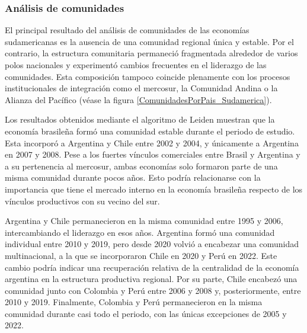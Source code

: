 


\subsubsection{Análisis de comunidades}


El principal resultado del análisis de comunidades de las economías sudamericanas es la ausencia de una comunidad regional única y estable. Por el contrario, la estructura comunitaria permaneció fragmentada alrededor de varios polos nacionales y experimentó cambios frecuentes en el liderazgo de las comunidades. Esta composición tampoco coincide plenamente con los procesos institucionales de integración como el  \gls{mercosur}, la Comunidad Andina o la Alianza del Pacífico (véase la figura \ref{ComunidadesPorPais_Sudamerica}).

Los resultados obtenidos mediante el algoritmo de Leiden muestran que la economía brasileña formó una comunidad estable durante el periodo de estudio. Esta incorporó a Argentina y Chile entre 2002 y 2004, y únicamente a Argentina en 2007 y 2008. Pese a los fuertes vínculos comerciales entre Brasil y Argentina y a su pertenencia al \gls{mercosur}, ambas economías solo formaron parte de una misma comunidad durante pocos años. Esto podría relacionarse con la importancia que tiene el mercado interno en la economía brasileña respecto de los vínculos productivos con su vecino del sur.

Argentina y Chile permanecieron en la misma comunidad entre 1995 y 2006, intercambiando el liderazgo en esos años. Argentina formó una comunidad individual entre 2010 y 2019, pero desde 2020 volvió a encabezar una comunidad multinacional, a la que se incorporaron Chile en 2020 y Perú en 2022. Este cambio podría indicar una recuperación relativa de la centralidad de la economía argentina en la estructura productiva regional. Por su parte, Chile encabezó una comunidad junto con Colombia y Perú entre 2006 y 2008 y, posteriormente, entre 2010 y 2019. Finalmente, Colombia y Perú permanecieron en la misma comunidad durante casi todo el periodo, con las únicas excepciones de 2005 y 2022. 

